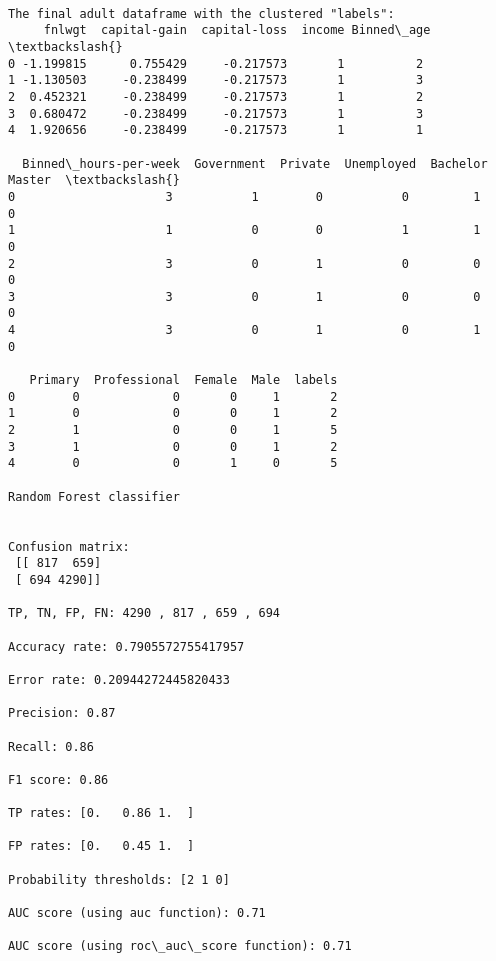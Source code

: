 \documentclass[11pt]{article}
\begin{document}
    \begin{Verbatim}[commandchars=\\\{\}]

The final adult dataframe with the clustered "labels":
     fnlwgt  capital-gain  capital-loss  income Binned\_age  \textbackslash{}
0 -1.199815      0.755429     -0.217573       1          2   
1 -1.130503     -0.238499     -0.217573       1          3   
2  0.452321     -0.238499     -0.217573       1          2   
3  0.680472     -0.238499     -0.217573       1          3   
4  1.920656     -0.238499     -0.217573       1          1   

  Binned\_hours-per-week  Government  Private  Unemployed  Bachelor  Master  \textbackslash{}
0                     3           1        0           0         1       0   
1                     1           0        0           1         1       0   
2                     3           0        1           0         0       0   
3                     3           0        1           0         0       0   
4                     3           0        1           0         1       0   

   Primary  Professional  Female  Male  labels  
0        0             0       0     1       2  
1        0             0       0     1       2  
2        1             0       0     1       5  
3        1             0       0     1       2  
4        0             0       1     0       5  

Random Forest classifier


Confusion matrix:
 [[ 817  659]
 [ 694 4290]]

TP, TN, FP, FN: 4290 , 817 , 659 , 694

Accuracy rate: 0.7905572755417957

Error rate: 0.20944272445820433

Precision: 0.87

Recall: 0.86

F1 score: 0.86

TP rates: [0.   0.86 1.  ]

FP rates: [0.   0.45 1.  ]

Probability thresholds: [2 1 0]

AUC score (using auc function): 0.71

AUC score (using roc\_auc\_score function): 0.71 


    \end{Verbatim}

    \begin{center}
    \end{center}
    { \hspace*{\fill} \\}
    
\end{document}
